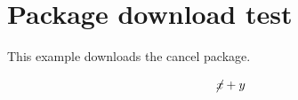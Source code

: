 \documentclass{article}
\begin{document}
\section*{Package download test}
This example downloads the cancel package.

\[\cancel{x} + y\]
\end{document}
